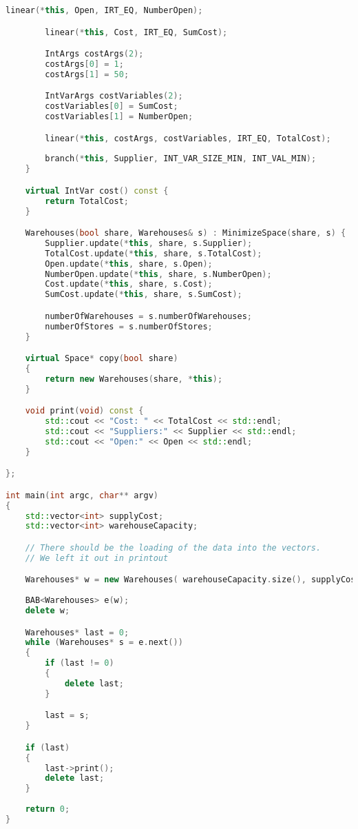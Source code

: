 \begin{lstlisting}[language=C++]
		linear(*this, Open, IRT_EQ, NumberOpen);

		linear(*this, Cost, IRT_EQ, SumCost);

		IntArgs costArgs(2);
		costArgs[0] = 1;
		costArgs[1] = 50;

		IntVarArgs costVariables(2);
		costVariables[0] = SumCost;
		costVariables[1] = NumberOpen;

		linear(*this, costArgs, costVariables, IRT_EQ, TotalCost);
		
		branch(*this, Supplier, INT_VAR_SIZE_MIN, INT_VAL_MIN);
	}

	virtual IntVar cost() const {
		return TotalCost;
	}

	Warehouses(bool share, Warehouses& s) : MinimizeSpace(share, s) {
		Supplier.update(*this, share, s.Supplier);
		TotalCost.update(*this, share, s.TotalCost);
		Open.update(*this, share, s.Open);
		NumberOpen.update(*this, share, s.NumberOpen);
		Cost.update(*this, share, s.Cost);
		SumCost.update(*this, share, s.SumCost);

		numberOfWarehouses = s.numberOfWarehouses;
		numberOfStores = s.numberOfStores;
	}

	virtual Space* copy(bool share)
	{
		return new Warehouses(share, *this);
	}

	void print(void) const {
		std::cout << "Cost: " << TotalCost << std::endl;
		std::cout << "Suppliers:" << Supplier << std::endl;
		std::cout << "Open:" << Open << std::endl;
	}

};

int main(int argc, char** argv)
{
	std::vector<int> supplyCost;
	std::vector<int> warehouseCapacity;

	// There should be the loading of the data into the vectors. 
	// We left it out in printout

 	Warehouses* w = new Warehouses( warehouseCapacity.size(), supplyCost.size()/warehouseCapacity.size(), supplyCost, warehouseCapacity);
	
	BAB<Warehouses> e(w);
	delete w;

	Warehouses* last = 0;
	while (Warehouses* s = e.next())
	{
		if (last != 0)
		{ 
			delete last; 
		}

		last = s;
	}

	if (last)
	{
		last->print();
		delete last;
	}
	
	return 0;
}
\end{lstlisting}